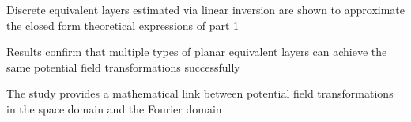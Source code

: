 \documentclass[draft]{agujournal2019}
\begin{document}






\begin{keypoints}
\item Discrete equivalent layers estimated via linear inversion are shown to approximate the 
closed form theoretical expressions of part 1
\item Results confirm that multiple types of planar equivalent layers can achieve the same 
potential field transformations successfully
\item The study provides a mathematical link between potential field transformations in the 
space domain and the Fourier domain
\end{keypoints}

%
%

%
%
\end{document}
